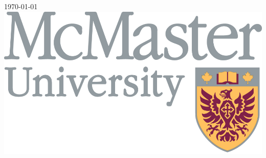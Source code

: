\documentclass[12pt]{article}
\begin{document}
\begin{titlepage}

{\large \today}\\[2cm] %


\includegraphics{McMasterfull_colour.jpg}\\[1cm] %

\end{titlepage}



\pagestyle{myheadings}

\newcommand{\jd}[1]{[[\textbf{JD: #1}]]}



\newpage


\newpage


\newpage
\renewcommand{\bibname}{References}
\nocite{*}



\end{document}
